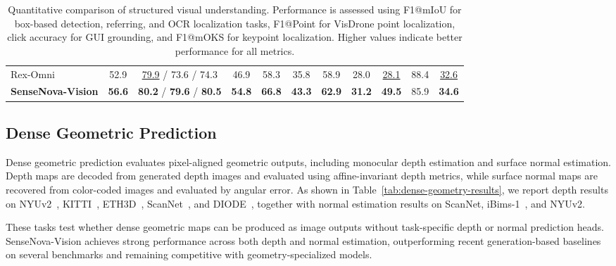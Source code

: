 \begin{table}[t]
{\begin{tabular}{l|cccccccccc}
            Rex-Omni~\cite{rexomni}                   & 52.9             & \underline{79.9} / 73.6 / 74.3       & 46.9              & 58.3             & 35.8              & 58.9              & 28.0            & \underline{28.1} & 88.4 & \underline{32.6} \\
            \textbf{SenseNova-Vision}                             & \textbf{56.6}             & \textbf{80.2} / \textbf{79.6} / \textbf{80.5} & \textbf{54.8}     & \textbf{66.8}    & \textbf{43.3}  & \textbf{62.9}       & \textbf{31.2}   & \textbf{49.5}   & 85.9 & \textbf{34.6}    \\
            \bottomrule
        \end{tabular}
    }
    \caption{
        Quantitative comparison of structured visual understanding.
        Performance is assessed using F1@mIoU for box-based detection, referring, and OCR localization tasks, F1@Point for VisDrone point localization, click accuracy for GUI grounding, and F1@mOKS for keypoint localization.
        Higher values indicate better performance for all metrics.
    }
    \label{tab:structured-results}
\end{table}

\subsection{Dense Geometric Prediction}

Dense geometric prediction evaluates pixel-aligned geometric outputs, including monocular depth estimation and surface normal estimation.
Depth maps are decoded from generated depth images and evaluated using affine-invariant depth metrics, while surface normal maps are recovered from color-coded images and evaluated by angular error.
As shown in Table~\ref{tab:dense-geometry-results}, we report depth results on NYUv2~\cite{silberman2012indoor}, KITTI~\cite{geiger2013vision}, ETH3D~\cite{schoeps2017multi}, ScanNet~\cite{dai2017scannetrichlyannotated3dreconstructions}, and DIODE~\cite{vasiljevic2019diode}, together with normal estimation results on ScanNet, iBims-1~\cite{koch2018evaluation}, and NYUv2.

These tasks test whether dense geometric maps can be produced as image outputs without task-specific depth or normal prediction heads.
SenseNova-Vision achieves strong performance across both depth and normal estimation, outperforming recent generation-based baselines on several benchmarks and remaining competitive with geometry-specialized models.

